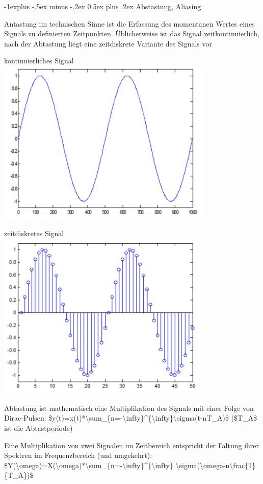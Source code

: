 \documentclass[a4paper]{article}
\makeatletter
\renewcommand{\subsection}{\@startsection{subsection}{2}{0mm}%
 {-1explus -.5ex minus -.2ex}%
 {0.5ex plus .2ex}%
 {\normalfont\normalsize\bfseries}}
\makeatother
\begin{document}
\begin{multicols}{3}
  \subsection{Abstastung, Aliasing}\label{abstastung-aliasing}

  Antastung im technischen Sinne ist die Erfassung des momentanen Wertes
  eines Signals zu definierten Zeitpunkten. Üblicherweise ist das Signal
  zeitkontinuierlich, nach der Abtastung liegt eine zeitdiskrete Variante
  des Signals vor

  \begin{itemize*}
    \item kontinuierliches Signal \includegraphics[width=.5\linewidth]{Assets/Biosignalverarbeitung-kontinuierliches-signal.png}
    \item zeitdiskretes Signal \includegraphics[width=.5\linewidth]{Assets/Biosignalverarbeitung-zeitdiskretes-signal.png}
  \end{itemize*}

  Abtastung ist mathematisch eine Multiplikation des Signals mit einer
  Folge von Dirac-Pulsen:
  \$y(t)=x(t)*\textbackslash sum\_\{n=-\textbackslash infty\}\^{}\{\textbackslash infty\}\textbackslash sigma(t-nT\_A)\$
  (\$T\_A\$ ist die Abtastperiode)

  Eine Multiplikation von zwei Signalen im Zeitbereich entspricht der
  Faltung ihrer Spektren im Frequenzbereich (und umgekehrt):
  \$Y(\textbackslash omega)=X(\textbackslash omega)*\textbackslash sum\_\{n=-\textbackslash infty\}\^{}\{\textbackslash infty\}
  \textbackslash sigma(\textbackslash omega-n\textbackslash frac\{1\}\{T\_A\})\$


\end{multicols}
\end{document}
